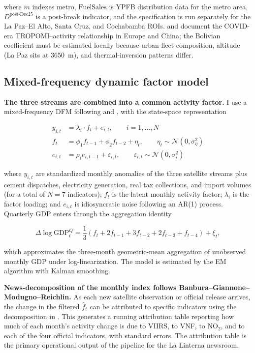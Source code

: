 \documentclass[11pt,letterpaper]{article}
\newcommand{\claim}[1]{\textbf{#1.}}
\begin{document}
where $m$ indexes metro, $\text{FuelSales}$ is YPFB distribution data for the metro area, $D^{\text{post-Dec25}}$ is a post-break indicator, and the specification is run separately for the La Paz--El Alto, Santa Cruz, and Cochabamba ROIs. \citet{bauwens2020} and \citet{liu_china2020} document the COVID-era TROPOMI--activity relationship in Europe and China; the Bolivian coefficient must be estimated locally because urban-fleet composition, altitude (La Paz sits at \num{3650}~m), and thermal-inversion patterns differ.

\subsection{Mixed-frequency dynamic factor model}

\claim{The three streams are combined into a common activity factor} I use a mixed-frequency DFM following \citet{mariano_murasawa2003} and \citet{grs2008}, with the state-space representation

\begin{align}
y_{i,t} &= \lambda_i \cdot f_t + e_{i,t}, \qquad i = 1, \ldots, N \label{eq:dfm_obs}\\
f_t &= \phi_1 f_{t-1} + \phi_2 f_{t-2} + \eta_t, \qquad \eta_t \sim \mathcal{N}(0, \sigma_\eta^2) \label{eq:dfm_state}\\
e_{i,t} &= \rho_i e_{i,t-1} + \varepsilon_{i,t}, \qquad \varepsilon_{i,t} \sim \mathcal{N}(0, \sigma_i^2) \label{eq:dfm_idio}
\end{align}

where $y_{i,t}$ are standardized monthly anomalies of the three satellite streams plus cement dispatches, electricity generation, real tax collections, and import volumes (for a total of $N = 7$ indicators); $f_t$ is the latent monthly activity factor; $\lambda_i$ is the factor loading; and $e_{i,t}$ is idiosyncratic noise following an AR(1) process. Quarterly GDP enters through the \citet{mariano_murasawa2003} aggregation identity

\begin{equation}
\Delta \log \text{GDP}^Q_t = \frac{1}{3}\left(f_t + 2 f_{t-1} + 3 f_{t-2} + 2 f_{t-3} + f_{t-4}\right) + \xi_t,
\label{eq:mm_aggregation}
\end{equation}

which approximates the three-month geometric-mean aggregation of unobserved monthly GDP under log-linearization. The model is estimated by the EM algorithm with Kalman smoothing.

\claim{News-decomposition of the monthly index follows Banbura--Giannone--Modugno--Reichlin} As each new satellite observation or official release arrives, the change in the filtered $\hat{f}_t$ can be attributed to specific indicators using the decomposition in \citet{bgmr2013}. This generates a running attribution table reporting how much of each month's activity change is due to VIIRS, to VNF, to NO$_2$, and to each of the four official indicators, with standard errors. The attribution table is the primary operational output of the pipeline for the La Linterna newsroom.
\end{document}
